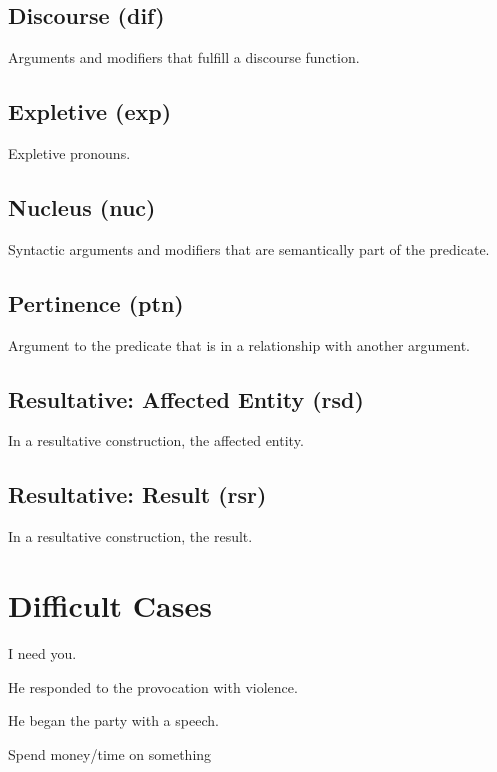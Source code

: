 \documentclass[a4paper]{article}
\begin{document}
\subsection{Discourse (dif)}

Arguments and modifiers that fulfill a discourse function.

\subsection{Expletive (exp)}

Expletive pronouns.

\subsection{Nucleus (nuc)}

Syntactic arguments and modifiers that are semantically part of the predicate.

\subsection{Pertinence (ptn)}

Argument to the predicate that is in a relationship with another argument.

\subsection{Resultative: Affected Entity (rsd)}

In a resultative construction, the affected entity.

\subsection{Resultative: Result (rsr)}

In a resultative construction, the result.

\section{Difficult Cases}

I need you.

He responded to the provocation with violence.

He began the party with a speech.

Spend money/time on something
\end{document}
